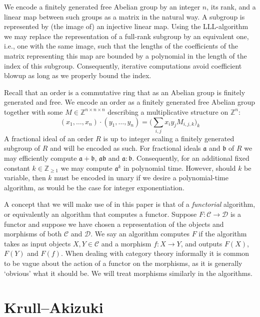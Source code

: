 \documentclass{amsart}
\theoremstyle{plain}
\theoremstyle{definition}
\newcommand{\Z}{\ensuremath{\mathbb{Z}}}
\begin{document}
We encode a finitely generated free Abelian group by an integer \(n\), its rank, and a linear map between such groups as a matrix in the natural way. A subgroup is represented by (the image of) an injective linear map.
Using the LLL-algorithm \cite[Section~5]{Lattices} we may replace the representation of a full-rank subgroup by an equivalent one, i.e., one with the same image, such that the lengths of the coefficients of the matrix representing this map are bounded by a polynomial in the length of the index of this subgroup.
Consequently, iterative computations avoid coefficient blowup as long as we properly bound the index.

Recall that an order is a commutative ring that as an Abelian group is finitely generated and free.
We encode an order as a finitely generated free Abelian group together with some \(M\in\Z^{n\times n\times n}\) describing a multiplicative structure on \(\Z^n\):
\[ (x_1,\dotsc,x_n) \cdot (y_1,\dotsc,y_n) = \Big( \sum_{i,j} x_i y_j M_{i,j,k} \Big)_k  \]
A fractional ideal of an order \(R\) is up to integer scaling a finitely generated subgroup of \(R\) and will be encoded as such.
For fractional ideals \(\mathfrak{a}\) and \(\mathfrak{b}\) of \(R\) we may efficiently compute \(\mathfrak{a}+\mathfrak{b}\), \(\mathfrak{a}\mathfrak{b}\) and \(\mathfrak{a}:\mathfrak{b}\).
Consequently, for an additional fixed constant $k\in\Z_{\geq 1}$ we may compute \(\mathfrak{a}^k\) in polynomial time.
However, should $k$ be variable, then $k$ must be encoded in unary if we desire a polynomial-time algorithm, as would be the case for integer exponentiation.

A concept that we will make use of in this paper is that of a \emph{functorial} algorithm, or equivalently an algorithm that computes a functor. 
Suppose $F:\mathcal{C}\to\mathcal{D}$ is a functor and suppose we have chosen a representation of the objects and morphisms of both $\mathcal{C}$ and $\mathcal{D}$.
We say an algorithm computes $F$ if the algorithm takes as input objects $X,Y\in\mathcal{C}$ and a morphism $f:X\to Y$, and outputs $F(X)$, $F(Y)$ and $F(f)$.
When dealing with category theory informally it is common to be vague about the action of a functor on the morphisms, as it is generally `obvious' what it should be.
We will treat morphisms similarly in the algorithms. 


\section{Krull--Akizuki}
\end{document}
